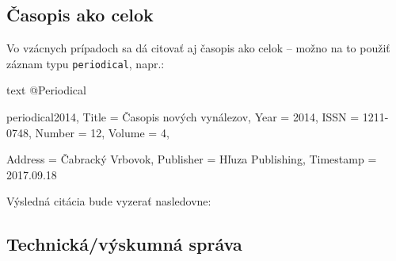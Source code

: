 \noindent[X] 

\subsection{Časopis ako celok}

Vo vzácnych prípadoch sa dá citovať aj časopis ako celok -- možno na to použiť záznam typu \texttt{periodical}, napr.:
\begin{inlinecode}[breaklines]{text}
@Periodical{periodical2014,
  Title                    = {Časopis nových vynálezov},
  Year                     = {2014},
  ISSN                     = {1211-0748},
  Number                   = {12},
  Volume                   = {4},

  Address                  = {Čabracký Vrbovok},
  Publisher                = {Hľuza Publishing},
  Timestamp                = {2017.09.18}
}
\end{inlinecode}
Výsledná citácia bude vyzerať nasledovne:

\noindent[X] 

%
%

\noindent[X] 




\subsection{Technická/výskumná správa}


